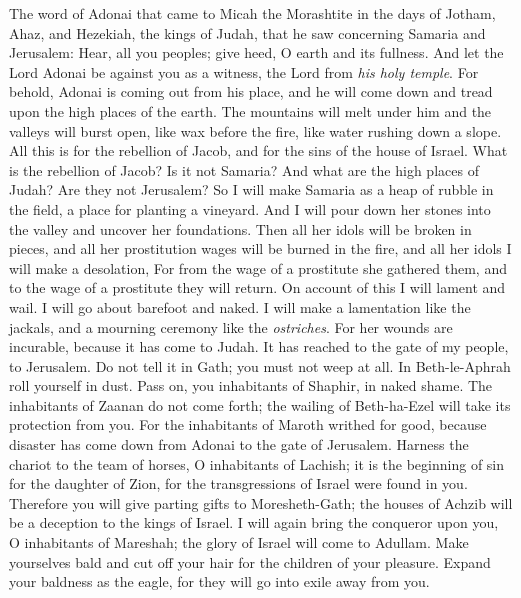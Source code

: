 
\begin{biblechapter} %
 The word of Adonai that came to Micah the Morashtite in the days of Jotham, Ahaz, and Hezekiah, the kings of Judah, that he saw concerning Samaria and Jerusalem:
\verse Hear, all you peoples; 
give heed, O earth and its fullness. 
And let the Lord Adonai be against you as a witness, 
the Lord from \textit{his holy temple}.
\verse For behold, Adonai is coming out from his place, 
and he will come down and tread upon the high places of the earth.
\verse The mountains will melt under him 
and the valleys will burst open, 
like wax before the fire, 
like water rushing down a slope.
\verse All this is for the rebellion of Jacob, 
and for the sins of the house of Israel. 
What is the rebellion of Jacob? 
Is it not Samaria? 
And what are the high places of Judah? 
Are they not Jerusalem?
\verse So I will make Samaria as a heap of rubble in the field, 
a place for planting a vineyard. 
And I will pour down her stones into the valley 
and uncover her foundations.
\verse Then all her idols will be broken in pieces, 
and all her prostitution wages will be burned in the fire, 
and all her idols I will make a desolation, 
For from the wage of a prostitute she gathered them, 
and to the wage of a prostitute they will return.
\verse On account of this I will lament and wail. 
I will go about barefoot and naked. 
I will make a lamentation like the jackals, 
and a mourning ceremony like the \textit{ostriches}.
\verse For her wounds are incurable, 
because it has come to Judah. 
It has reached to the gate of my people, to Jerusalem.
\verse Do not tell it in Gath; 
you must not weep at all. 
In Beth-le-Aphrah 
roll yourself in dust.
\verse Pass on, you inhabitants of Shaphir, 
in naked shame. 
The inhabitants of Zaanan do not come forth; 
the wailing of Beth-ha-Ezel will take its protection from you.
\verse For the inhabitants of Maroth 
writhed for good, 
because disaster has come down from Adonai 
to the gate of Jerusalem.
\verse Harness the chariot to the team of horses, 
O inhabitants of Lachish; 
it is the beginning of sin 
for the daughter of Zion, 
for the transgressions of Israel 
were found in you.
\verse Therefore you will give parting gifts 
to Moresheth-Gath; 
the houses of Achzib will be a deception 
to the kings of Israel.
\verse I will again bring the conqueror upon you, 
O inhabitants of Mareshah; 
the glory of Israel 
will come to Adullam.
\verse Make yourselves bald 
and cut off your hair 
for the children of your pleasure. 
Expand your baldness as the eagle, 
for they will go into exile away from you.
\end{biblechapter}

